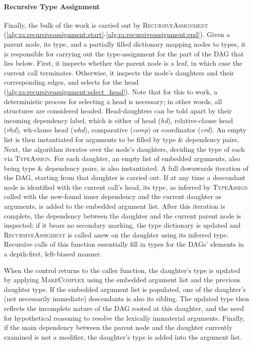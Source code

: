 \paragraph{Recursive Type Assignment}
Finally, the bulk of the work is carried out by \textsc{RecursiveAssignment} (\ref{alg:ra:recursiveassignment:start}-\ref{alg:ra:recursiveassignment:end}).
Given a parent node, its type, and a partially filled dictionary mapping nodes to types, it is responsible for carrying out the type-assignment for the part of the DAG that lies below.
First, it inspects whether the parent node is a leaf, in which case the current call terminates.
Otherwise, it inspects the node's daughters and their corresponding edges, and selects for the head (\ref{alg:ra:recursiveassignment:select_head}). 
Note that for this to work, a deterministic process for selecting a head is necessary; in other words, all structures are considered headed. 
Head-daughters can be told apart by their incoming dependency label, which is either of head (\textit{hd}), relative-clause head (\textit{rhd}), wh-clause head (\textit{whd}), comparative (\textit{comp}) or coordinator (\textit{crd}).
An empty list is then instantiated for arguments to be filled by type \& dependency pairs.
Next, the algorithm iterates over the node's daughters, deciding the type of each via \textsc{TypeAssign}.
For each daughter, an empty list of embedded arguments, also being type \& dependency pairs, is also instantiated.
A full downwards iteration of the DAG, starting from that daughter is carried out.
If at any time a descendant node is identified with the current call's head, its type, as inferred by \textsc{TypeAssign} called with the new-found inner dependency and the current daughter as arguments, is added to the embedded argument list.
After this iteration is complete, the dependency between the daughter and the current parent node is inspected; if it bears no secondary marking, the type dictionary is updated and \textsc{RecursiveAssigment} is called anew on the daughter using its inferred type.
Recursive calls of this function essentially fill in types for the DAGs' elements in a depth-first, left-biased manner.

When the control returns to the caller function, the daughter's type is updated by applying \textsc{MakeComplex} using the embedded argument list and the previous daughter type.
If the embedded argument list is populated, one of the daughter's (not necessarily immediate) descendants is also its sibling.
The updated type then reflects the incomplete nature of the DAG rooted at this daughter, and the need for hypothetical reasoning to resolve the lexically immaterial arguments.
Finally, if the main dependency between the parent node and the daughter currently examined is not a modifier, the daughter's type is added into the argument list.

